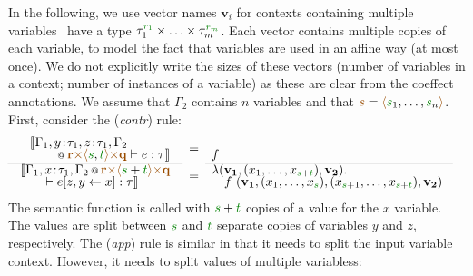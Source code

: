 In the following, we use vector names $\mathbf{v}_i$ for contexts containing multiple variables
\ie~have a type $\tau_1^{\cclrd{r_1}}\times\ldots\times\tau_m^{\cclrd{r_m}}$. Each vector contains
multiple copies of each variable, to model the fact that variables are used in an affine way (at most
once). We do not explicitly write the sizes of these vectors (number of variables in a context; number
of instances of a variable) as these are clear from the coeffect annotations. We assume that $\Gamma_2$
contains $n$ variables and that $\aclrd{s}=\alift{\cclrd{s}_1, \ldots, \cclrd{s}_n}$. First, consider
the (\emph{contr}) rule:
%
\begin{equation*}
\hspace{-1em}
\begin{array}{l}
\mdeff
  {\begin{array}{l}\sem{\coctx{\Gamma_1,y\!:\!\tau_1,z\!:\!\tau_1,\Gamma_2\\[-0.25em]\qquad}
      {\aclrd{\textbf{r}} \atimes \alift{\cclrd{s},\cclrd{t}} \atimes \aclrd{\textbf{q}}} \vdash e : \tau}\end{array}}
  {\begin{array}{l}\sem{\coctx{\Gamma_1,x\!:\!\tau_1,\Gamma_2}{\aclrd{\textbf{r}}
          \atimes \alift{\cclrd{s} + \cclrd{t}} \atimes \aclrd{\textbf{q}}} \\[-0.25em] \qquad\vdash \subst{e}{z,y}{x} : \tau}\end{array}}
  {\begin{array}{l}~\\[-0.25em]\hspace{-0.5em}f\end{array}}
  {\hspace{-0.5em}\begin{array}{l}\lambda(\mathbf{v_1}, (x_1, \ldots, x_{\cclrd{s}+\cclrd{t}}), \mathbf{v_2}) .\\[-0.25em]
  \quad f~(\mathbf{v_1}, (x_1, \ldots, x_{\cclrd{s}}), (x_{\cclrd{s}+1}, \ldots, x_{\cclrd{s}+\cclrd{t}} ), \mathbf{v_2})\end{array}\hspace{-0.5em}~}
\end{array}
\end{equation*}
%
The semantic function is called with $\cclrd{s}+\cclrd{t}$ copies of
a value for the $x$ variable. The values are split between $\cclrd{s}$ and $\cclrd{t}$ separate
copies of variables $y$ and $z$, respectively. The (\emph{app}) rule is similar in that it needs to
split the input variable context. However, it needs to split values of multiple variabless:
